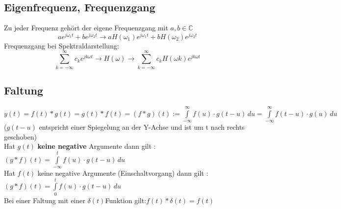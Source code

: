 	\subsection{Eigenfrequenz, Frequenzgang}
	Zu jeder Frequenz gehört der eigene Frequenzgang mit $a, b \in \mathbb{C}$\\
	$$a e^{j\omega_1 t} + b e^{j\omega_2 t} \rightarrow a H(\omega_1) e^{j\omega_1 t} + b H(\omega_2) e^{j\omega_2 t}$$
	Frequenzgang bei Spektraldarstellung: $$\sum_{k=-\infty}^{\infty} c_k e^{jk\omega t} \rightarrow \boxed{H(\omega)}
	\rightarrow \sum_{k=-\infty}^{\infty} c_k H(\omega k) e^{jk\omega t}$$			
	
	\subsection{Faltung}
	$y(t) = f(t)\ast g(t) = g(t) \ast f(t) = (f \ast g)(t) :=
	\int\limits_{-\infty}^\infty f(u) \cdot g(t-u)\,du =
	\int\limits_{-\infty}^\infty f(t-u) \cdot g(u)\,du $ \\
	($g(t-u)$ entspricht einer Spiegelung an der Y-Achse und ist um t nach rechts geschoben)\\
	
	Hat $g\left(t\right)$ \textbf{keine negative} Argumente dann gilt :
	$\left(g \ast f \right)\left(t\right)=\int\limits_{-\infty}^t f(u) \cdot
	g(t-u)\,du$\\
	Hat $f\left(t\right)$ keine negative Argumente (Einschaltvorgang) dann gilt :
	$\left(g \ast f \right)\left(t\right)=\int\limits_{0}^t f(u) \cdot
	g(t-u)\,du$\\
	Bei einer Faltung mit einer $\delta\left(t\right)$Funktion
	gilt:$f\left(t\right) \ast \delta\left(t\right) = f\left(t\right)$
	
